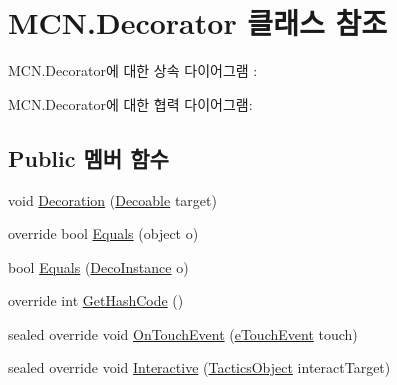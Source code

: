 \hypertarget{class_m_c_n_1_1_decorator}{}\section{M\+C\+N.\+Decorator 클래스 참조}
\label{class_m_c_n_1_1_decorator}


M\+C\+N.\+Decorator에 대한 상속 다이어그램 \+: 


M\+C\+N.\+Decorator에 대한 협력 다이어그램\+:
\subsection*{Public 멤버 함수}
\begin{DoxyCompactItemize}
\item 
void \hyperlink{class_m_c_n_1_1_decorator_ab82c83f62182a25a72dc81530c743c32}{Decoration} (\hyperlink{class_m_c_n_1_1_decoable}{Decoable} target)
\item 
override bool \hyperlink{class_m_c_n_1_1_decorator_ae2a5432ce00298c80dcb433a75bbe45d}{Equals} (object o)
\item 
bool \hyperlink{class_m_c_n_1_1_decorator_a3ad7a8cf76c976907116f85a65a9f8e9}{Equals} (\hyperlink{class_m_c_n_1_1_deco_instance}{Deco\+Instance} o)
\item 
override int \hyperlink{class_m_c_n_1_1_decorator_a6df84cd2af5b096128e84791455c083f}{Get\+Hash\+Code} ()
\item 
sealed override void \hyperlink{class_m_c_n_1_1_decorator_ab99273d32a380d567f03737ea57ec083}{On\+Touch\+Event} (\hyperlink{_touch_manager_8cs_ae33e321a424fe84ba8b2fdb81ad40a68}{e\+Touch\+Event} touch)
\item 
sealed override void \hyperlink{class_m_c_n_1_1_decorator_ae58cb79cf1ee47006b7dbdac82b97dc5}{Interactive} (\hyperlink{class_tactics_object}{Tactics\+Object} interact\+Target)
\end{DoxyCompactItemize}
